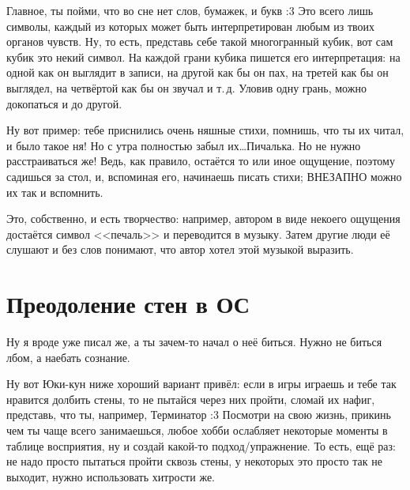\documentclass[a4paper,14pt,oneside]{memoir}
\begin{document}
Главное, ты пойми, что во сне нет слов, бумажек, и букв :3 Это всего лишь символы, каждый из которых может быть интерпретирован любым из твоих органов чувств. Ну, то есть, представь себе такой многогранный кубик, вот сам кубик это некий символ. На каждой грани кубика пишется его интерпретация: на одной как он выглядит в записи, на другой как бы он пах, на третей как бы он выглядел, на четвёртой как бы он звучал и т.\,д. Уловив одну грань, можно докопаться и до другой.
 
Ну вот пример: тебе приснились очень няшные стихи, помнишь, что ты их читал, и было такое ня! Но с утра полностью забыл их\ldots Пичалька. Но не нужно расстраиваться же! Ведь, как правило, остаётся то или иное ощущение, поэтому садишься за стол, и, вспоминая его, начинаешь писать стихи; ВНЕЗАПНО можно их так и вспомнить. 

Это, собственно, и есть творчество: например, автором в виде некоего ощущения достаётся символ <<печаль>> и переводится в музыку. Затем другие люди её слушают и без слов понимают, что автор хотел этой музыкой выразить.



\chapter{Преодоление стен в ОС}


\medskip
Ну я вроде уже писал же, а ты зачем-то начал о неё биться. Нужно не биться лбом, а наебать сознание.
 
Ну вот Юки-кун ниже хороший вариант привёл: если в игры играешь и тебе так нравится долбить стены, то не пытайся через них пройти, сломай их нафиг, представь, что ты, например, Терминатор :3 Посмотри на свою жизнь, прикинь чем ты чаще всего занимаешься, любое хобби ослабляет некоторые моменты в таблице восприятия, ну и создай какой-то подход/упражнение. То есть, ещё раз: не надо просто пытаться пройти сквозь стены, у некоторых это просто так не выходит, нужно использовать хитрости же.
\end{document}
